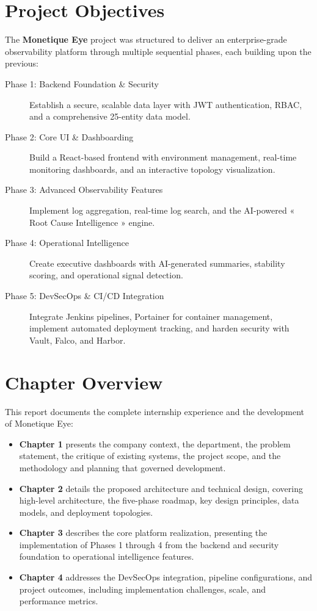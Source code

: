 \documentclass[12pt,a4paper]{report}
\begin{document}
\section*{Project Objectives}

The \textbf{Monetique Eye} project was structured to deliver an enterprise-grade observability platform through multiple sequential phases, each building upon the previous:

\begin{description}
  \item[Phase 1: Backend Foundation \& Security] Establish a secure, scalable data layer with JWT authentication, RBAC, and a comprehensive 25-entity data model.
  \item[Phase 2: Core UI \& Dashboarding] Build a React-based frontend with environment management, real-time monitoring dashboards, and an interactive topology visualization.
  \item[Phase 3: Advanced Observability Features] Implement log aggregation, real-time log search, and the AI-powered « Root Cause Intelligence » engine.
  \item[Phase 4: Operational Intelligence] Create executive dashboards with AI-generated summaries, stability scoring, and operational signal detection.
  \item[Phase 5: DevSecOps \& CI/CD Integration] Integrate Jenkins pipelines, Portainer for container management, implement automated deployment tracking, and harden security with Vault, Falco, and Harbor.
\end{description}

\section*{Chapter Overview}

This report documents the complete internship experience and the development of Monetique Eye:

\begin{itemize}
  \item \textbf{Chapter 1} presents the company context, the department, the problem statement, the critique of existing systems, the project scope, and the methodology and planning that governed development.
  
  \item \textbf{Chapter 2} details the proposed architecture and technical design, covering high-level architecture, the five-phase roadmap, key design principles, data models, and deployment topologies.
  
  \item \textbf{Chapter 3} describes the core platform realization, presenting the implementation of Phases 1 through 4 from the backend and security foundation to operational intelligence features.
  
  \item \textbf{Chapter 4} addresses the DevSecOps integration, pipeline configurations, and project outcomes, including implementation challenges, scale, and performance metrics.
\end{itemize}
\end{document}
